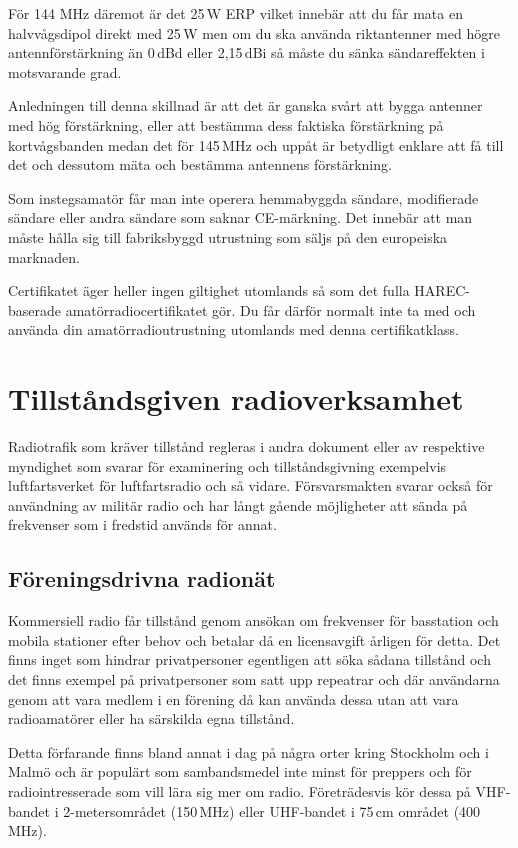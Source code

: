 För 144 MHz däremot är det 25\,W ERP vilket innebär att du får mata en
halvvågsdipol direkt med 25\,W men om du ska använda riktantenner med högre
antennförstärkning än 0\,dBd eller 2,15\,dBi så måste du sänka sändareffekten
i motsvarande grad.

Anledningen till denna skillnad är att det är ganska svårt att bygga antenner
med hög förstärkning, eller att bestämma dess faktiska förstärkning på
kortvågsbanden medan det för 145\,MHz och uppåt är betydligt enklare att få
till det och dessutom mäta och bestämma antennens förstärkning.

Som instegsamatör får man inte operera hemmabyggda sändare, modifierade
sändare eller andra sändare som saknar CE-märkning. Det innebär att man måste
hålla sig till fabriksbyggd utrustning som säljs på den europeiska marknaden.

Certifikatet äger heller ingen giltighet utomlands så som det fulla
HAREC-baserade amatörradiocertifikatet gör. Du får därför normalt inte ta med
och använda din amatörradioutrustning utomlands med denna certifikatklass.

\section{Tillståndsgiven radioverksamhet}

Radiotrafik som kräver tillstånd regleras i andra dokument eller av respektive
myndighet som svarar för examinering och tillståndsgivning exempelvis
luftfartsverket för luftfartsradio och så vidare. Försvarsmakten svarar också
för användning av militär radio och har långt gående möjligheter att sända på
frekvenser som i fredstid används för annat.

\subsection{Föreningsdrivna radionät}

Kommersiell radio får tillstånd genom ansökan om frekvenser för basstation och
mobila stationer efter behov och betalar då en licensavgift årligen för
detta. Det finns inget som hindrar privatpersoner egentligen att söka sådana
tillstånd och det finns exempel på privatpersoner som satt upp repeatrar och där
användarna genom att vara medlem i en förening då kan använda dessa utan att
vara radioamatörer eller ha särskilda egna tillstånd.

Detta förfarande finns bland annat i dag på några orter kring Stockholm och i
Malmö och är populärt som sambandsmedel inte minst för preppers och för
radiointresserade som vill lära sig mer om radio. Företrädesvis kör dessa på
VHF-bandet i 2-metersområdet (150\,MHz) eller UHF-bandet i 75\,cm området
(400\,MHz).

